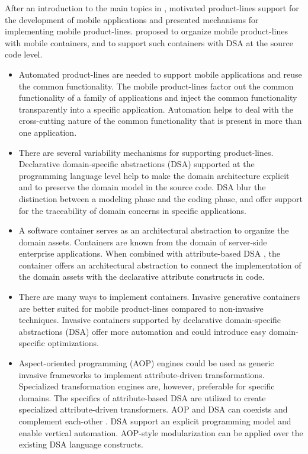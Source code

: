 After an introduction to the main topics in , \textbf{} motivated product-lines support for the development of mobile applications and presented mechanisms for implementing mobile product-lines.  proposed to organize mobile product-lines with mobile containers, and to support such containers with DSA at the source code level.

\begin{itemize}

\item Automated product-lines are needed to support mobile applications and reuse the common functionality. The mobile product-lines factor out the common functionality of a family of applications and inject the common functionality transparently into a specific application. Automation helps to deal with the cross-cutting nature of the common functionality that is present in more than one application.

\item There are several variability mechanisms for supporting product-lines. Declarative domain-specific abstractions (DSA) supported at the programming language level help to make the domain architecture explicit and to preserve the domain model in the source code. DSA blur the distinction between a modeling phase and the coding phase, and offer support for the traceability of domain concerns in specific applications.

\item A software container serves as an architectural abstraction to organize the domain assets. Containers are known from the domain of server-side enterprise applications. When combined with attribute-based DSA , the container offers an architectural abstraction to connect the implementation of the domain assets with the declarative attribute constructs in code.

\item There are many ways to implement containers. Invasive generative containers are better suited for mobile product-lines compared to non-invasive techniques. Invasive containers supported by declarative domain-specific abstractions (DSA) offer more automation and could introduce easy domain-specific optimizations.

\item Aspect-oriented programming (AOP) engines could be used as generic invasive frameworks to implement attribute-driven transformations. Specialized transformation engines are, however, preferable for specific domains. The specifics of attribute-based DSA are utilized to create specialized attribute-driven transformers. AOP and DSA can coexists and complement each-other . DSA support an explicit programming model and enable vertical automation. AOP-style modularization can be applied over the existing DSA language constructs. 

\end{itemize}

